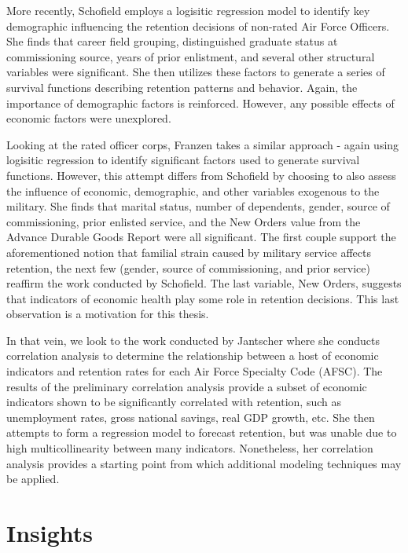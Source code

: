 \documentclass[12pt,letterpaper,toc=flat,oneside]{report}
\theoremstyle{definition}
\theoremstyle{definition}
\theoremstyle{definition}
\theoremstyle{remark}
\begin{document}
More recently, Schofield \cite{schofield-2015} employs a logisitic
regression model to identify key demographic influencing the retention
decisions of non-rated Air Force Officers. She finds that career field
grouping, distinguished graduate status at commissioning source, years
of prior enlistment, and several other structural variables were
significant. She then utilizes these factors to generate a series of
survival functions describing retention patterns and behavior. Again,
the importance of demographic factors is reinforced. However, any
possible effects of economic factors were unexplored.

Looking at the rated officer corps, Franzen \cite{franzen-2017} takes a
similar approach - again using logisitic regression to identify
significant factors used to generate survival functions. However, this
attempt differs from Schofield by choosing to also assess the influence
of economic, demographic, and other variables exogenous to the military.
She finds that marital status, number of dependents, gender, source of
commissioning, prior enlisted service, and the New Orders value from the
Advance Durable Goods Report were all significant. The first couple
support the aforementioned notion that familial strain caused by
military service affects retention, the next few (gender, source of
commissioning, and prior service) reaffirm the work conducted by
Schofield. The last variable, New Orders, suggests that indicators of
economic health play some role in retention decisions. This last
observation is a motivation for this thesis.

In that vein, we look to the work conducted by Jantscher
\cite{jantscher-2016} where she conducts correlation analysis to
determine the relationship between a host of economic indicators and
retention rates for each Air Force Specialty Code (AFSC). The results of
the preliminary correlation analysis provide a subset of economic
indicators shown to be significantly correlated with retention, such as
unemployment rates, gross national savings, real GDP growth, etc. She
then attempts to form a regression model to forecast retention, but was
unable due to high multicollinearity between many indicators.
Nonetheless, her correlation analysis provides a starting point from
which additional modeling techniques may be applied.

\hypertarget{insights}{%
\section{Insights}\label{insights}}
\end{document}
